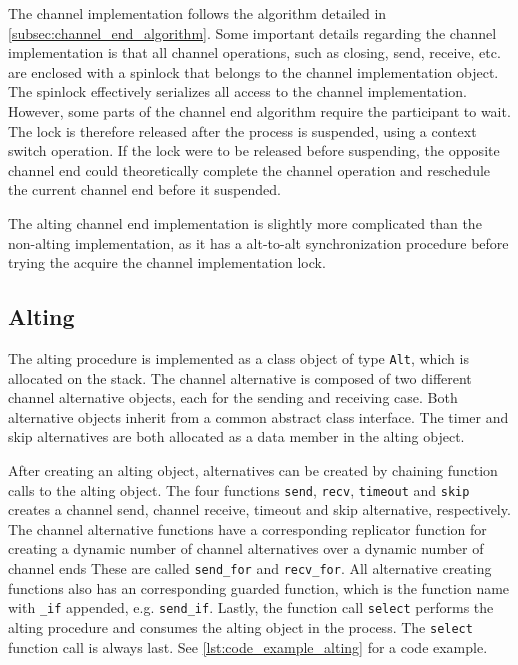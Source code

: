 The channel implementation follows the algorithm detailed in \cref{subsec:channel_end_algorithm}. Some important details regarding the channel implementation is that all channel operations, such as closing, send, receive, etc. are enclosed with a spinlock that belongs to the channel implementation object. The spinlock effectively serializes all access to the channel implementation. However, some parts of the channel end algorithm require the participant to wait. The lock is therefore released after the process is suspended, using a context switch operation. If the lock were to be released before suspending, the opposite channel end could theoretically complete the channel operation and reschedule the current channel end before it suspended.

The alting channel end implementation is slightly more complicated than the non\hyp{}alting implementation, as it has a alt\hyp{}to\hyp{}alt synchronization procedure before trying the acquire the channel implementation lock.


\subsection{Alting}


The alting procedure is implemented as a class object of type \lstinline[style={CustomC++}]|Alt|, which is allocated on the stack. The channel alternative is composed of two different channel alternative objects, each for the sending and receiving case. Both alternative objects inherit from a common abstract class interface. The timer and skip alternatives are both allocated as a data member in the alting object. 

After creating an alting object, alternatives can be created by chaining function calls to the alting object. The four functions \texttt{send}, \texttt{recv}, \texttt{timeout} and \texttt{skip} creates a channel send, channel receive, timeout and skip alternative, respectively. The channel alternative functions have a corresponding replicator function for creating a dynamic number of channel alternatives over a dynamic number of channel ends These are called \texttt{send\_for} and \texttt{recv\_for}. All alternative creating functions also has an corresponding guarded function, which is the function name with \texttt{\_if} appended, e.g. \texttt{send\_if}. Lastly, the function call \texttt{select} performs the alting procedure and consumes the alting object in the process. The \texttt{select} function call is always last. See \cref{lst:code_example_alting} for a code example.

